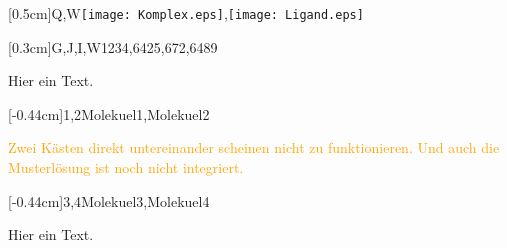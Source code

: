 \documentclass[./main.tex]{subfiles}
\begin{document}
\kastenarray{6cm}{4cm}[0.5cm]{Q,W}{\texttt{[image: Komplex.eps]},\texttt{[image: Ligand.eps]}}

\kastenarray{2.5cm}{3cm}[0.3cm]{G,J,I,W}{1234,6425,672,6489}

Hier ein Text. 

\kastenarray{7cm}{7cm}[-0.44cm]{1,2}{Molekuel1,Molekuel2}

\textcolor{orange}{Zwei K\"asten direkt untereinander scheinen nicht zu funktionieren. Und auch die Musterl\"osung ist noch nicht integriert.}

\kastenarray{7cm}{7cm}[-0.44cm]{3,4}{Molekuel3,Molekuel4}


Hier ein Text. 

\clearpage
\aufgabenende
\end{document}
